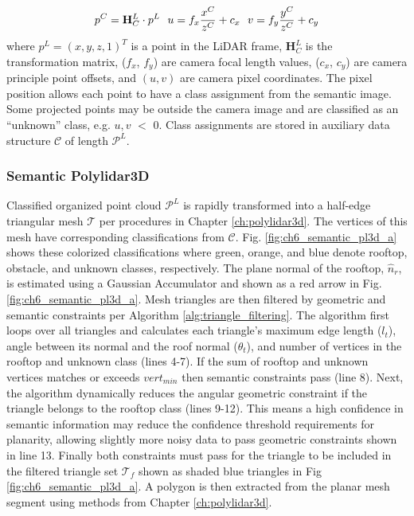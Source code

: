 \begin{equation}
 \label{eq:transform_points} 
    p^{C} = \mathbf{H}^L_C \cdot p^{L} \\
    \ \ u = f_{x} \frac{x^{C}}{z^{C}}+c_{x} \\
    \ \ v = f_{y} \frac{y^{C}}{z^{C}}+c_{y}  
\end{equation}
where $p^{L} = (x,y,z,1)^T$ is a point in the LiDAR frame, $ \mathbf{H}^L_C$ is the transformation matrix, ($f_x$, $f_y$) are camera focal length values, ($c_x$, $c_y$) are camera principle point offsets, and $(u,v)$ are camera pixel coordinates.  The pixel position allows each point to have a class assignment from the semantic image. Some projected points may be outside the camera image and are classified as an ``unknown'' class, e.g. $u,v$ $<$ 0. Class assignments are stored in auxiliary data structure $\mathcal{C}$ of length $\mathcal{P}^L$.

\subsubsection{Semantic Polylidar3D} \label{sec:ch6_methods_semantic_polylidar3d}

Classified organized point cloud $\mathcal{P}^L$ is rapidly transformed into a half-edge triangular mesh $\mathcal{T}$  per procedures in Chapter \ref{ch:polylidar3d}. The vertices of this mesh have corresponding classifications from $\mathcal{C}$. Fig. \ref{fig:ch6_semantic_pl3d_a} shows these colorized classifications where green, orange, and blue denote rooftop, obstacle, and unknown classes, respectively. The plane normal of the rooftop, $\hat{n}_r$, is estimated using a Gaussian Accumulator and shown as a red arrow in Fig. \ref{fig:ch6_semantic_pl3d_a}. Mesh triangles are then filtered by geometric and semantic constraints per Algorithm \ref{alg:triangle_filtering}. The algorithm first loops over all triangles and calculates each triangle's maximum edge length ($l_t$), angle between its normal and the roof normal ($\theta_t$), and number of vertices in the rooftop and unknown class (lines 4-7). If the sum of rooftop and unknown vertices matches or exceeds $vert_{min}$ then semantic constraints pass (line 8). Next, the algorithm dynamically reduces the angular geometric constraint if the triangle belongs to the rooftop class (lines 9-12). This means a high confidence in semantic information may reduce the confidence threshold requirements for planarity, allowing slightly more noisy data to pass geometric constraints shown in line 13. Finally both constraints must pass for the triangle to be included in the filtered triangle set $\mathcal{T}_f$ shown as shaded blue triangles in Fig \ref{fig:ch6_semantic_pl3d_a}. A polygon is then extracted from the planar mesh segment using methods from Chapter \ref{ch:polylidar3d}.

